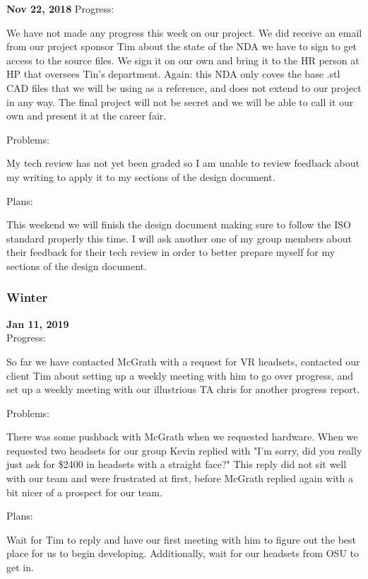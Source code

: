 \textbf{Nov 22, 2018}
Progress:

We have not made any progress this week on our project.  We did receive an email from our project sponsor Tim about the state of the NDA we have to sign to get access to the source files. We sign it on our own and bring it to the HR person at HP that oversees Tin's department. Again: this NDA only coves the base .stl CAD files that we will be using as a reference, and does not extend to our project in any way. The final project will not be secret and we will be able to call it our own and present it at the career fair.

Problems:

My tech review has not yet been graded so I am unable to review feedback about my writing to apply it to my sections of the design document.

Plans:

This weekend we will finish the design document making sure to follow the ISO standard properly this time. I will ask another one of my group members about their feedback for their tech review in order to better prepare myself for my sections of the design document. \\

\subsubsection{Winter}

\textbf{Jan 11, 2019}\\
Progress:

So far we have contacted McGrath with a request for VR headsets, contacted our client Tim about setting up a weekly meeting with him to go over progress, and set up a weekly meeting with our illustrious TA chris for another progress report.

Problems:

There was some pushback with McGrath when we requested hardware. When we requested two headsets for our group Kevin replied with "I’m sorry, did you really just ask for \$2400 in headsets with a straight face?" This reply did not sit well with our team and were frustrated at first, before McGrath replied again with a bit nicer of a prospect for our team.

Plans:

Wait for Tim to reply and have our first meeting with him to figure out the best place for us to begin developing. Additionally, wait for our headsets from OSU to get in.\\

